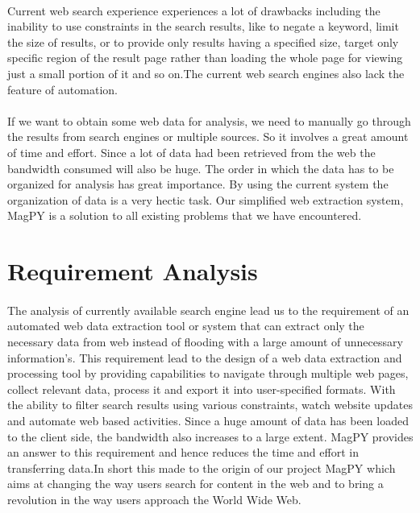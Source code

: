 \documentclass[a4paper]{report}
\begin{document}
\paragraph{}
\large\textnormal{Current web search experience experiences a lot of drawbacks including the inability to use constraints in the search results, like to negate a keyword, limit the size of results, or to provide only results having a specified size, target only specific region of the result page rather than loading the whole page for viewing just a small portion of it and so on.The current web search engines also lack the feature of automation.}
\paragraph{}
\large\textnormal{If we want to obtain some web data for analysis, we need to manually go through the results from search engines or multiple sources. So it involves a great amount of time and effort. Since a lot of data had been retrieved from the web the bandwidth consumed will also be huge.  The order in which the data has to be organized for analysis has great importance. By using the current system the organization of data is a very hectic task. Our simplified web extraction system, MagPY is a solution to all existing problems that we have encountered.}
\section{Requirement Analysis}
\paragraph{}
\large\textnormal{The analysis of currently available search engine lead us to the requirement of an automated web data extraction tool or system that can extract only the necessary data from web instead of flooding with a large amount of unnecessary information’s. This requirement lead to the design of a web data extraction and processing tool by providing capabilities to navigate through multiple web pages, collect relevant data, process it and export it into user-specified formats. With the ability to filter search results using various constraints, watch website updates and automate web based activities. Since a huge amount of data has been loaded to the client side, the bandwidth also increases to a large extent. MagPY provides an answer to this requirement and hence reduces the time and effort in transferring data.In short this made to the origin of our project MagPY which aims at changing the way users search for content in the web and to bring a revolution in the way users approach the World Wide Web.}
\end{document}
